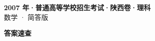 \documentclass[zihao=-4, a4paper]{ctexart}
\begin{document}
\begin{center}
  {\Large\bfseries 2007 年·普通高等学校招生考试·陕西卷·理科}\\[4pt]
  {\large 数学 · 简答版}
\end{center}
\medskip
{}

\clearpage
{}
\begin{center}{\Large\bfseries 答案速查}\end{center}
\medskip

\end{document}
